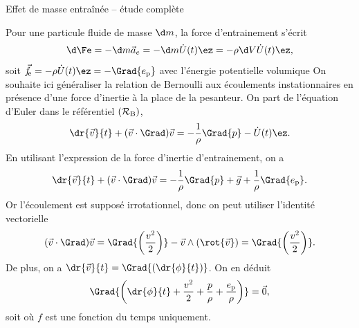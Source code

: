 \begin{exo}[PC][1][devoir]{Effet de masse entraînée -- étude complète}
\begin{quest}
 {Pour une particule fluide de masse $\d m$, la force d’entrainement s’écrit
$$ \d \Fe = -\d m \Vec{a}_e = -\d m \dot{U}(t) \ez = -\rho \d V \dot{U}(t) \ez,$$  soit $\Vec{f}_{\rm \! e} = -\rho \dot{U}(t) \ez = -\Grad{e_{\rm p}}$ avec l’énergie potentielle volumique
}
{
  On souhaite ici généraliser la relation de Bernoulli aux écoulements instationnaires en présence d’une force d’inertie à la place de la pesanteur. On part de l’équation d’Euler dans le référentiel $(\mathcal{R}_{\rm{B}})$,
  $$\dr{\Vec{v}}{t} + (\Vec{v}\cdot \Grad)\Vec{v} = -\frac{1}{\rho} \Grad{p}  - \dot{U}(t) \ez.$$
  En utilisant l’expression de la force d’inertie d’entrainement, on a
  $$\dr{\Vec{v}}{t} + (\Vec{v}\cdot \Grad)\Vec{v} = -\frac{1}{\rho} \Grad{p} + \Vec{g} + \frac{1}{\rho} \Grad{e_{\rm p}}.$$
  Or l’écoulement est supposé irrotationnel, donc on peut utiliser l’identité vectorielle
  $$(\Vec{v}\cdot \Grad)\Vec{v} = \Grad{\left(\frac{v^2}{2}\right)} - \Vec{v} \wedge (\rot{\Vec{v}}) = \Grad{\left(\frac{v^2}{2}\right)}.$$
  De plus, on a $\dr{\Vec{v}}{t} = \Grad{\left(\dr{\phi}{t}\right)}$. On en déduit
  $$\Grad{\left(\dr{\phi}{t} + \frac{v^2}{2} + \frac{p}{\rho} + \frac{e_{\rm p}}{\rho}  \right)} = \Vec{0},$$ soit
  où $f$ est une fonction du temps uniquement.
}


\end{quest}
\end{exo}
